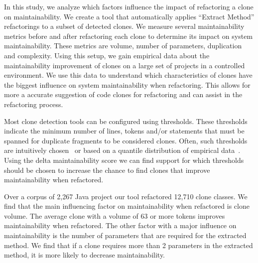 \documentclass[sigconf,review,anonymous]{acmart}
\begin{document}
In this study, we analyze which factors influence the impact of refactoring a clone on maintainability. We create a tool that automatically applies ``Extract Method'' refactorings to a subset of detected clones. We measure several maintainability metrics \cite{heitlager2007practical} before and after refactoring each clone to determine its impact on system maintainability. These metrics are volume, number of parameters, duplication and complexity. Using this setup, we gain empirical data about the maintainability improvement of clones on a large set of projects in a controlled environment. We use this data to understand which characteristics of clones have the biggest influence on system maintainability when refactoring. This allows for more a accurate suggestion of code clones for refactoring and can assist in the refactoring process.

Most clone detection tools can be configured using thresholds. These thresholds indicate the minimum number of lines, tokens and/or statements that must be spanned for duplicate fragments to be considered clones. Often, such thresholds are intuitively chosen~\cite{li2006cp, roy2009mutation} or based on a quantile distribution of empirical data~\cite{alves2010deriving}. Using the delta maintainability score we can find support for which thresholds should be chosen to increase the chance to find clones that improve maintainability when refactored.

Over a corpus of 2,267 Java project our tool refactored 12,710 clone classes. We find that the main influencing factor on maintainability when refactored is clone volume. %
The average clone with a volume of 63 or more tokens improves maintainability when refactored. The other factor with a major influence on maintainability is the number of parameters that are required for the extracted method. We find that if a clone requires more than 2 parameters in the extracted method, it is more likely to decrease maintainability.
\end{document}
